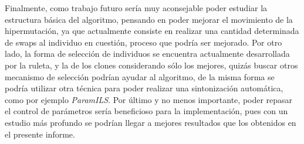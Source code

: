 Finalmente, como trabajo futuro sería muy aconsejable poder estudiar la estructura básica
del algoritmo, pensando en poder mejorar el movimiento de la hipermutación, ya que actualmente
consiste en realizar una cantidad determinada de swaps al individuo en cuestión, proceso que podría ser
mejorado. Por otro lado, la forma de selección de individuos se encuentra actualmente desarrollada
por la ruleta, y la de los clones considerando sólo los mejores, quizás buscar otros mecanismo
de selección podrían ayudar al algoritmo, de la misma forma se podría utilizar otra técnica para poder
realizar una sintonización automática, como por ejemplo \emph{ParamILS}.
Por último y no menos importante, poder repasar el control de parámetros sería beneficioso para
la implementación, pues con un estudio más profundo se podrían llegar a mejores resultados que los obtenidos
en el presente informe.
